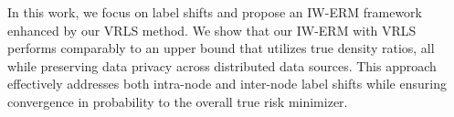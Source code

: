 In this work, we focus on label shifts and propose an IW-ERM framework enhanced by our VRLS method. We show that our IW-ERM with VRLS performs comparably to an upper bound that utilizes true density ratios, all while preserving data privacy across distributed data sources. This approach 
effectively addresses both intra-node and inter-node label shifts while ensuring convergence in probability to the overall true risk minimizer.
